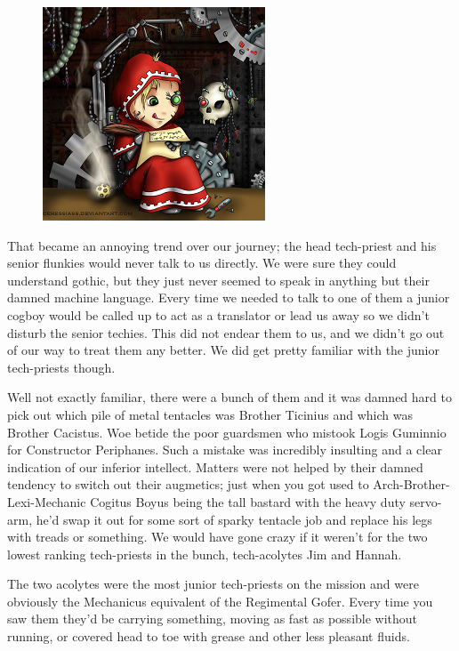 \begin{figure}
	\begin{center}
		\includegraphics[width=\figwidth]{pics/7/3.png}
	\end{center}
\end{figure}
That became an annoying trend over our journey; 
the head tech-priest and his senior flunkies would never talk to us directly. 
We were sure they could understand gothic, but they just never seemed to speak in anything but their damned machine language. 
Every time we needed to talk to one of them a junior cogboy would be called up to act as a translator or lead us away so we didn’t disturb the senior techies. 
This did not endear them to us, and we didn’t go out of our way to treat them any better. 
We did get pretty familiar with the junior tech-priests though.

Well not exactly familiar, there were a bunch of them and it was damned hard to pick out which pile of metal tentacles was Brother Ticinius and which was Brother Cacistus. 
Woe betide the poor guardsmen who mistook Logis Guminnio for Constructor Periphanes. 
Such a mistake was incredibly insulting and a clear indication of our inferior intellect. 
Matters were not helped by their damned tendency to switch out their augmetics; 
just when you got used to Arch-Brother-Lexi-Mechanic Cogitus Boyus being the tall bastard with the heavy duty servo-arm, he’d swap it out for some sort of sparky tentacle job and replace his legs with treads or something. 
We would have gone crazy if it weren’t for the two lowest ranking tech-priests in the bunch, tech-acolytes Jim and Hannah.
 
The two acolytes were the most junior tech-priests on the mission and were obviously the Mechanicus equivalent of the Regimental Gofer. 
Every time you saw them they’d be carrying something, moving as fast as possible without running, or covered head to toe with grease and other less pleasant fluids. 


